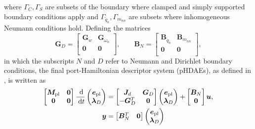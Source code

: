 \documentclass[letterpaper, 10 pt, conference]{ieeeconf}
\begin{document}
where $\Gamma_{C},\Gamma_{S}$ are subsets of the boundary where clamped and simply supported boundary conditions apply and $\Gamma_{\widetilde{q}_n},\Gamma_{m_{nn}}$ are subsets where inhomogeneous Neumann conditions hold. Defining the matrices 
\[\bm{G}_D = \begin{bmatrix}
\bm{G}_{w} & \bm{G}_{\omega_n} \\
\bm{0} & \bm{0}  \\
\end{bmatrix}, \qquad 
\bm{B}_N = \begin{bmatrix}
\bm{B}_{\widetilde{q}_n} & \bm{B}_{m_{nn}} \\
\bm{0} & \bm{0}  \\
\end{bmatrix},
\]
in which the subscripts $N$ and $D$ refer to Neumann and Dirichlet boundary conditions, the final port-Hamiltonian descriptor system (pHDAEs), as defined in \cite{beattie2018linear}, is written as
\begin{equation}
\begin{aligned}
\label{eq:discr_pl}
\begin{bmatrix}
\bm{M}_{\text{pl}} & \bm{0} \\
\bm{0} & \bm{0} \\
\end{bmatrix} \frac{\d}{\d t}
\begin{pmatrix}
\bm{e}_{\text{pl}}\\
\bm{\lambda}_D \\
\end{pmatrix}
&= \begin{bmatrix}
\bm{J}_d & \bm{G}_D\\
-\bm{G}_D^T & \bm{0} \\
\end{bmatrix}
\begin{pmatrix}
\bm{e}_{\text{pl}}\\
\bm{\lambda}_D \\
\end{pmatrix} + \begin{bmatrix}
\bm{B}_N\\
\bm{0} \\
\end{bmatrix}
\bm{u}, \\
\bm{y} &= \begin{bmatrix}
\bm{B}_N^T & \bm{0} \\ \end{bmatrix}
\begin{pmatrix}
\bm{e}_{\text{pl}}\\
\bm{\lambda}_D \\
\end{pmatrix}
\end{aligned}
\end{equation}
\end{document}
